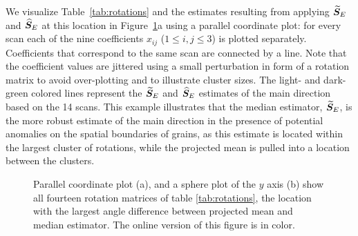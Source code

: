 We visualize Table~\ref{tab:rotations} and the estimates resulting from applying ${\widetilde{\bm S}_E}$ and ${\widehat{\bm S}_E}$ at this location in Figure~\ref{fig:pcp}a using a parallel coordinate plot: for every scan each of the nine coefficients $x_{ij}$ ($1 \le i,j \le 3$) is plotted separately. Coefficients that correspond to the same scan are connected by a line.   Note that the coefficient values are jittered using a small perturbation in form of a rotation matrix to avoid over-plotting and to illustrate cluster sizes. The light- and dark- green colored lines represent the ${\widetilde{\bm S}_E}$ and ${\widehat{\bm S}_E}$ estimates of the main direction based on the 14 scans.   This example  illustrates that the median estimator, ${\widetilde{\bm S}_E}$,  %
is the more robust estimate of the main direction in the presence of potential anomalies on the spatial boundaries of grains, as this estimate is located within the largest cluster of rotations, while the projected mean is pulled into a location between the clusters.


\begin{figure}[htbp] %
   \centering
   
   \caption{ \label{fig:pcp} Parallel coordinate plot (a), and a sphere plot of the $y$ axis (b) show all fourteen rotation matrices of table \ref{tab:rotations}, the location with the largest angle difference between projected mean and median estimator. The online version of this figure is in color.}
\end{figure}
